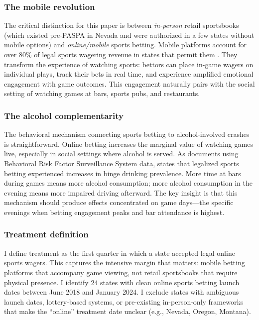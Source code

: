 \documentclass[12pt]{article}
\begin{document}
\subsubsection*{The mobile revolution} The critical distinction for this paper is between \textit{in-person} retail sportsbooks (which existed pre-PASPA in Nevada and were authorized in a few states without mobile options) and \textit{online/mobile} sports betting. Mobile platforms account for over 80\% of legal sports wagering revenue in states that permit them \citep{AGA2023}. They transform the experience of watching sports: bettors can place in-game wagers on individual plays, track their bets in real time, and experience amplified emotional engagement with game outcomes. This engagement naturally pairs with the social setting of watching games at bars, sports pubs, and restaurants.

\subsubsection*{The alcohol complementarity} The behavioral mechanism connecting sports betting to alcohol-involved crashes is straightforward. Online betting increases the marginal value of watching games live, especially in social settings where alcohol is served. As \citet{Swanson2023} documents using Behavioral Risk Factor Surveillance System data, states that legalized sports betting experienced increases in binge drinking prevalence. More time at bars during games means more alcohol consumption; more alcohol consumption in the evening means more impaired driving afterward. The key insight is that this mechanism should produce effects concentrated on game days---the specific evenings when betting engagement peaks and bar attendance is highest.

\subsubsection*{Treatment definition} I define treatment as the first quarter in which a state accepted legal online sports wagers. This captures the intensive margin that matters: mobile betting platforms that accompany game viewing, not retail sportsbooks that require physical presence. I identify 24 states with clean online sports betting launch dates between June 2018 and January 2024. I exclude states with ambiguous launch dates, lottery-based systems, or pre-existing in-person-only frameworks that make the ``online'' treatment date unclear (e.g., Nevada, Oregon, Montana).
\end{document}
